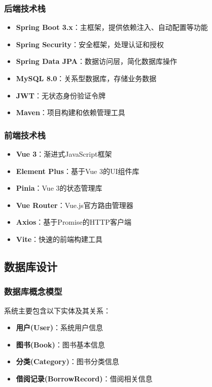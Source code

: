 \documentclass[12pt,a4paper]{article}
\begin{document}
\subsubsection{后端技术栈}
\begin{itemize}
    \item \textbf{Spring Boot 3.x}：主框架，提供依赖注入、自动配置等功能
    \item \textbf{Spring Security}：安全框架，处理认证和授权
    \item \textbf{Spring Data JPA}：数据访问层，简化数据库操作
    \item \textbf{MySQL 8.0}：关系型数据库，存储业务数据
    \item \textbf{JWT}：无状态身份验证令牌
    \item \textbf{Maven}：项目构建和依赖管理工具
\end{itemize}

\subsubsection{前端技术栈}
\begin{itemize}
    \item \textbf{Vue 3}：渐进式JavaScript框架
    \item \textbf{Element Plus}：基于Vue 3的UI组件库
    \item \textbf{Pinia}：Vue 3的状态管理库
    \item \textbf{Vue Router}：Vue.js官方路由管理器
    \item \textbf{Axios}：基于Promise的HTTP客户端
    \item \textbf{Vite}：快速的前端构建工具
\end{itemize}

\subsection{数据库设计}

\subsubsection{数据库概念模型}
系统主要包含以下实体及其关系：
\begin{itemize}
    \item \textbf{用户(User)}：系统用户信息
    \item \textbf{图书(Book)}：图书基本信息
    \item \textbf{分类(Category)}：图书分类信息
    \item \textbf{借阅记录(BorrowRecord)}：借阅相关信息
\end{itemize}
\end{document}

